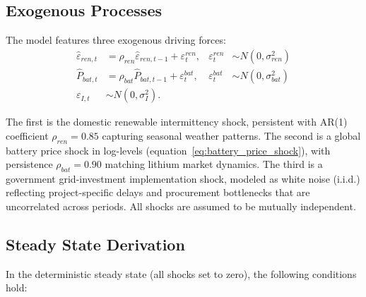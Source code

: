 	
\subsection{Exogenous Processes}
	
	The model features three exogenous driving forces:
	\begin{align}
		\hat{\varepsilon}_{ren,t} &= \rho_{ren} \hat{\varepsilon}_{ren,t-1} + \varepsilon^{ren}_t, & \varepsilon^{ren}_t &\sim N(0, \sigma^2_{ren}) \label{eq:shock_ren} \\
		\hat{P}_{bat,t} &= \rho_{bat} \hat{P}_{bat,t-1} + \varepsilon^{bat}_t, & \varepsilon^{bat}_t &\sim N(0, \sigma^2_{bat}) \label{eq:shock_bat} \\
		\varepsilon_{I,t} &\sim N(0, \sigma^2_I) \label{eq:shock_gov}.
	\end{align}
	
	The first is the domestic renewable intermittency shock, persistent with AR(1) coefficient $\rho_{ren} = 0.85$ capturing seasonal weather patterns. The second is a global battery price shock in log-levels (equation~\ref{eq:battery_price_shock}), with persistence $\rho_{bat} = 0.90$ matching lithium market dynamics. The third is a government grid-investment implementation shock, modeled as white noise (i.i.d.) reflecting project-specific delays and procurement bottlenecks that are uncorrelated across periods. All shocks are assumed to be mutually independent.

\subsection{Steady State Derivation} \label{app:steadystate}

In the deterministic steady state (all shocks set to zero), the following conditions hold:

